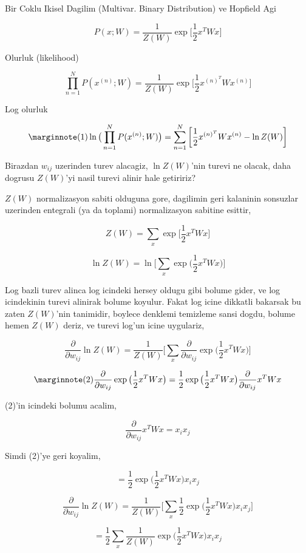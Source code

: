 \documentclass[12pt,fleqn]{article}\usepackage{../common}
\begin{document}
Bir Coklu Ikisel Dagilim (Multivar. Binary Distribution) ve Hopfield Agi

$$  
P(x;W) = \frac{1}{Z(W)} 
\exp \bigg[ \frac{1}{2} x^T W x \bigg]
$$

Olurluk (likelihood)

$$  
\prod _{n=1}^{N} P(x^{(n)};W) = \frac{1}{Z(W)} 
\exp \bigg[ \frac{1}{2} x^{(n)^T} W x^{(n)} \bigg]
$$

Log olurluk

$$  
\mlabel{1}
\ln \big( \prod _{n=1}^{N} P(x^{(n)};W) \big) = 
\sum _{n=1}^{N} \bigg[ \frac{1}{2} x^{(n)^T} W x^{(n)} - \ln Z(W) \bigg]
$$


Birazdan $w_{ij}$ uzerinden turev alacagiz, $\ln Z(W)$'nin turevi ne
olacak, daha dogrusu $Z(W)$'yi nasil turevi alinir hale getiririz?

$Z(W)$ normalizasyon sabiti olduguna gore, dagilimin geri kalaninin
sonsuzlar uzerinden entegrali (ya da toplami) normalizasyon sabitine
esittir, 

$$ 
Z(W) = \sum_x  \exp \bigg[ \frac{1}{2} x^T W x \bigg]
 $$

$$ 
\ln Z(W) = \ln \bigg[ \sum_x  \exp \big( \frac{1}{2} x^T W x \big) \bigg]
 $$

Log bazli turev alinca log icindeki hersey oldugu gibi bolume gider, ve log
icindekinin turevi alinirak bolume koyulur. Fakat log icine dikkatli
bakarsak bu zaten $Z(W)$'nin tanimidir, boylece denklemi temizleme sansi
dogdu, bolume hemen $Z(W)$ deriz, ve turevi log'un icine uygulariz,


$$ 
\frac{\partial}{\partial w_{ij}} \ln Z(W) = 
\frac{1}{Z(W)}
\bigg[ 
\sum_x \frac{\partial}{\partial w_{ij}} \exp \big( \frac{1}{2} x^T W x \big) 
\bigg]
 $$


$$ 
\mlabel{2}
\frac{\partial}{\partial w_{ij}} \exp \big( \frac{1}{2} x^T W x \big)  = 
\frac{1}{2}  \exp \big( \frac{1}{2} x^T W x \big) 
\frac{\partial}{\partial w_{ij}}x^T W x
$$

(2)'in icindeki bolumu acalim,

$$ \frac{\partial}{\partial w_{ij}}x^T W x = x_i x_j $$

Simdi (2)'ye geri koyalim,

$$ 
=  \frac{1}{2}  \exp \big( \frac{1}{2} x^T W x \big) x_i x_j
 $$


$$ 
\frac{\partial}{\partial w_{ij}} \ln Z(W) = 
\frac{1}{Z(W)}
\bigg[ 
\sum_x \frac{1}{2}  \exp \big( \frac{1}{2} x^T W x \big) x_i x_j
\bigg]
 $$

$$ 
= 
\frac{1}{2}  \sum_x \frac{1}{Z(W)}  \exp \big( \frac{1}{2} x^T W x \big) x_i x_j
 $$
\end{document}
